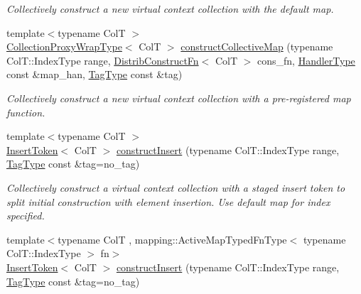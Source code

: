 \begin{DoxyCompactItemize}
\begin{DoxyCompactList}\small\item\em Collectively construct a new virtual context collection with the default map. \end{DoxyCompactList}\item 
{\footnotesize template$<$typename ColT $>$ }\\\hyperlink{structvt_1_1vrt_1_1collection_1_1_collection_manager_a56458ed7f9bb22b631b9b3a745f42f94}{Collection\+Proxy\+Wrap\+Type}$<$ ColT $>$ \hyperlink{structvt_1_1vrt_1_1collection_1_1_collection_manager_ae4f96ce01b13d68e5f3a8be7bea7e439}{construct\+Collective\+Map} (typename Col\+T\+::\+Index\+Type range, \hyperlink{structvt_1_1vrt_1_1collection_1_1_collection_manager_a7503830bc133013d542856fa39834dcc}{Distrib\+Construct\+Fn}$<$ ColT $>$ cons\+\_\+fn, \hyperlink{namespacevt_af64846b57dfcaf104da3ef6967917573}{Handler\+Type} const \&map\+\_\+han, \hyperlink{namespacevt_a84ab281dae04a52a4b243d6bf62d0e52}{Tag\+Type} const \&tag)
\begin{DoxyCompactList}\small\item\em Collectively construct a new virtual context collection with a pre-\/registered map function. \end{DoxyCompactList}\item 
{\footnotesize template$<$typename ColT $>$ }\\\hyperlink{structvt_1_1vrt_1_1collection_1_1_insert_token}{Insert\+Token}$<$ ColT $>$ \hyperlink{structvt_1_1vrt_1_1collection_1_1_collection_manager_a0e15cc861c0d979d8977b226efd7c271}{construct\+Insert} (typename Col\+T\+::\+Index\+Type range, \hyperlink{namespacevt_a84ab281dae04a52a4b243d6bf62d0e52}{Tag\+Type} const \&tag=no\+\_\+tag)
\begin{DoxyCompactList}\small\item\em Collectively construct a virtual context collection with a staged insert token to split initial construction with element insertion. Use default map for index specified. \end{DoxyCompactList}\item 
{\footnotesize template$<$typename ColT , mapping\+::\+Active\+Map\+Typed\+Fn\+Type$<$ typename Col\+T\+::\+Index\+Type $>$ fn$>$ }\\\hyperlink{structvt_1_1vrt_1_1collection_1_1_insert_token}{Insert\+Token}$<$ ColT $>$ \hyperlink{structvt_1_1vrt_1_1collection_1_1_collection_manager_a51e938c8c05bf9a39ab69532ea12336d}{construct\+Insert} (typename Col\+T\+::\+Index\+Type range, \hyperlink{namespacevt_a84ab281dae04a52a4b243d6bf62d0e52}{Tag\+Type} const \&tag=no\+\_\+tag)

\end{DoxyCompactItemize}
